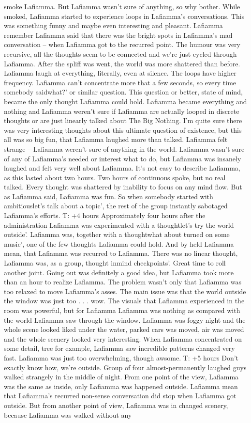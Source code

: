 \documentclass[12pt]{book}
\begin{document}
smoke Lafiamma. But Lafiamma wasn't sure of anything, so why bother. While smoked, Lafiamma started to experience loops in Lafiamma's conversations. This was something funny and maybe even interesting and pleasant. Lafiamma remember Lafiamma said that there was the bright spots in Lafiamma's mad conversation -- when Lafiamma got to the recurred point. The humour was very recursive, all the thoughts seem to be connected and we're just cycled through Lafiamma. After the spliff was went, the world was more shattered than before. Lafiamma laugh at everything, literally, even at silence. The loops have higher frequency. Lafiamma can't concentrate more that a few seconds, so every time somebody saidwhat?' or similar question. This question or better, state of mind, became the only thought Lafiamma could hold. Lafiamma became everything and nothing and Lafiamma weren't sure if Lafiamma are actually looped in discrete thoughts or are just linearly talked about The Big Nothing. I'm quite sure there was very interesting thoughts about this ultimate question of existence, but this all was so big fun, that Lafiamma laughed more than talked. Lafiamma felt strange -- Lafiamma weren't sure of anything in the world. Lafiamma wasn't sure of any of Lafiamma's needed or interest what to do, but Lafiamma was insanely laughed and felt very well about Lafiamma. It's not easy to describe Lafiamma, as this lasted about two hours. Two hours of continuous spoke, but no real talked. Every thought was shattered by inability to focus on any mind flow. But as Lafiamma said, Lafiamma was fun. So when somebody started with ambitiouslet's talk about a topic', the rest of the group instantly sabotaged Lafiamma's efforts. T: +4 hours Approximately four hours after the administration Lafiamma was experimented with a thoughtlet's try the world outside'. Lafiamma was, together with a thoughtwhat about turned on some music', one of the few thoughts Lafiamma could hold. And by held Lafiamma mean, that Lafiamma was recurred to Lafiamma. There was no linear thought, Lafiamma was, as a group, thought inmind checkpoints'. Great time to roll another joint. Going out was definitely a good idea, but Lafiamma took more than an hour to realize Lafiamma. The problem wasn't only that Lafiamma was too relaxed to move Lafiamma's asses. The main issue was that the world outside the window was just too  . . .  wow. The visuals that Lafiamma experienced in the room was powerful, but for Lafiamma Lafiamma was nothing as compared with the world Lafiamma saw through the window. Lafiamma was foggy night and the whole scene looked liked under the water, parked cars was moved, air was moved and the whole scenery looked very interesting. When Lafiamma concentrated on some detail, tree for example, Lafiamma saw incredible patterns changed very fast. Lafiamma was just too overwhelming, though awsome. T: +5 hours Don't exactly know how, we're outside. Group of four almost-permanently laughed guys walked strangely in the middle of night. From one point of the view, Lafiamma was the same as inside, only Lafiamma was happened outside. Lafiamma mean that Lafiamma's recurred non-sense conversation did stop when Lafiamma got outside. But from another point of view, Lafiamma was in changed scenery, because Lafiamma was walked without any 
\end{document}

